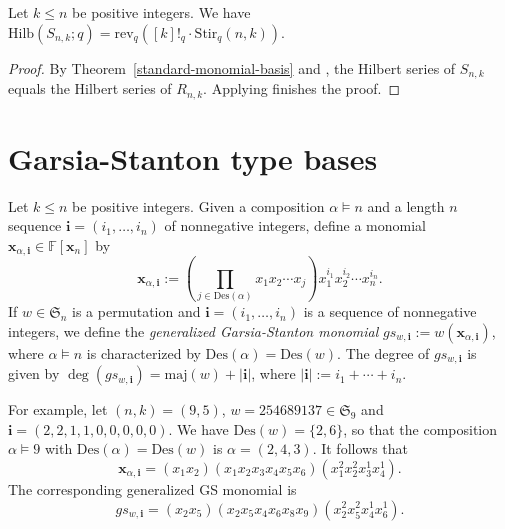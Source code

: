 \documentclass[ALCO,ThmDefs,published]{cedram}
\newcommand{\symm}{{\mathfrak{S}}}
\newcommand{\xx}{{\mathbf {x}}}
\newcommand{\FF}{{\mathbb{F}}}
\theoremstyle{plain}
\newcommand{\maj}{{\mathrm {maj}}}
\newcommand{\Des}{{\mathrm {Des}}}
\newcommand{\Stir}{{\mathrm {Stir}}}
\newcommand{\Hilb}{{\mathrm {Hilb}}}
\newcommand{\rev}{{\mathrm {rev}}}
\newcommand{\symm}{{\mathfrak{S}}}
\newcommand{\FF}{{\mathbb{F}}}
\newcommand{\GS}{{\mathcal{GS}}}
\newcommand{\xx}{{\mathbf {x}}}
\newcommand{\ii}{{\mathbf{i}}}
\begin{document}
\begin{theorem}
\label{hilbert-series}
Let $k \leq n$ be positive integers.  We have
$\Hilb(S_{n,k};q) = \rev_q([k]!_q \cdot \Stir_q(n,k))$.
\end{theorem}

\begin{proof}
By Theorem~\ref{standard-monomial-basis} and \cite[Thm. 4.13]{HRS}, the Hilbert series of $S_{n,k}$ equals the Hilbert series of $R_{n,k}$. 
Applying \cite[Thm. 4.10]{HRS} finishes the proof.
\end{proof}






















\section{Garsia-Stanton type bases}
\label{Garsia}

Let $k \leq n$ be positive integers.
Given a composition $\alpha \models n$ and a length $n$ sequence $\ii = (i_1, \dots, i_n)$ 
of nonnegative integers, define a monomial $\xx_{\alpha,\ii} \in \FF[\xx_n]$ by
\begin{equation}
\xx_{\alpha,\ii} := \left( \prod_{j \in \Des(\alpha)} x_1 x_2 \cdots x_j \right) x_1^{i_1} x_2^{i_2} \cdots x_{n}^{i_{n}}.
\end{equation}
If $w \in \symm_n$ is a permutation and $\ii = (i_1, \dots, i_n)$ is a sequence of nonnegative integers, we 
define the \emph{generalized Garsia-Stanton monomial}
$gs_{w,\ii} := w(\xx_{\alpha,\ii})$, where $\alpha \models n$ is characterized by $\Des(\alpha) = \Des(w)$.
The degree of $gs_{w,\ii}$ is given by $\deg(gs_{w,\ii}) = \maj(w) + |\ii|$, where
$|\ii| := i_1 + \cdots  + i_n$.

For example, let $(n,k) = (9,5)$, $w = 254689137 \in \symm_9$ and $\ii = (2,2,1,1,0,0,0,0,0)$.  We have $\Des(w) = \{2,6\}$, so that the composition $\alpha \models 9$ with
$\Des(\alpha) = \Des(w)$ is $\alpha = (2,4,3)$.  It follows that
\begin{equation*}
\xx_{\alpha,\ii} = (x_1 x_2) (x_1 x_2 x_3 x_4 x_5 x_6) (x_1^2 x_2^2 x_3^1 x_4^1).
\end{equation*}
The corresponding generalized GS monomial is
\begin{equation*}
gs_{w,\ii} = (x_2 x_5) (x_2 x_5 x_4 x_6 x_8 x_9) (x_2^2 x_5^2 x_4^1 x_6^1).
\end{equation*}
\end{document}
